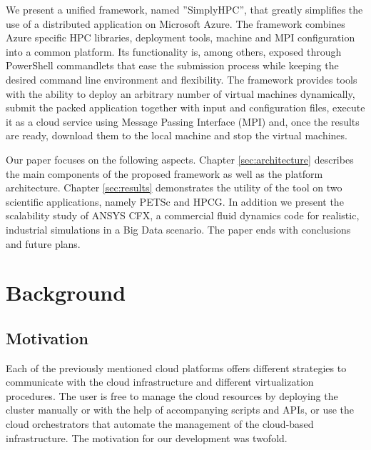 \documentclass[3p,times]{elsarticle}
\begin{document}
We present a unified framework, named ''SimplyHPC'',  that greatly simplifies the use of a distributed application on Microsoft Azure. The framework combines Azure specific HPC libraries, deployment tools, machine and MPI configuration into a common platform. Its functionality is, among others, exposed through PowerShell commandlets that ease the submission process while keeping the desired command line environment and flexibility. The framework provides tools with the ability to deploy an arbitrary number of virtual machines dynamically, submit the packed application together with input and configuration files, execute it as a cloud service using Message Passing Interface (MPI) and, once the results are ready, download them to the local machine and stop the virtual machines. 

Our paper focuses on the following aspects. Chapter \ref{sec:architecture} describes the main components of the proposed framework as well as the platform architecture. Chapter \ref{sec:results} demonstrates the utility of the tool on two scientific applications, namely PETSc and HPCG. In addition we present the scalability study of ANSYS CFX, a commercial fluid dynamics code for realistic, industrial simulations in a Big Data scenario. The paper ends with conclusions and future plans.




\section{Background}
\label{sec:background}
\subsection{Motivation}
Each of the previously mentioned cloud platforms offers different strategies to communicate with the cloud infrastructure and different virtualization procedures. The user is free to manage the cloud resources by deploying the cluster manually or with the help of accompanying scripts and APIs, or use the cloud orchestrators that automate the management of the cloud-based infrastructure. The motivation for our development was twofold.
\end{document}
